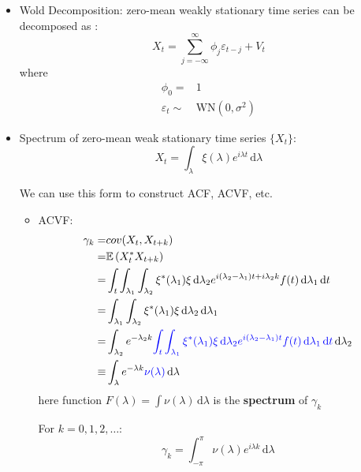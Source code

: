 \begin{itemize}[topsep=2pt,itemsep=0pt]
            
    

        \item Wold Decomposition: zero-mean weakly stationary time series can be decomposed as :
        \begin{equation}
            X_t=\sum_{j=-\infty}^\infty \phi _j\varepsilon _{t-j}+V_t 
        \end{equation}
        where
        \begin{align*}
            \phi _0=&1\\
            \varepsilon _t\sim &\mathrm{WN}(0,\sigma ^2) 
        \end{align*}


        \item Spectrum of zero-mean weak stationary time series $ \{X_t\} $:
        \begin{equation}
            X_t=\int _\lambda \xi (\lambda )e^{i\lambda t} \,\mathrm{d}\lambda 
        \end{equation}

        We can use this form to construct ACF, ACVF, etc.
        \begin{itemize}[topsep=2pt,itemsep=0pt]
            \item ACVF:
            \begin{align*}
                \gamma _k=&cov(X_t,X_{t+k})\\
                =&\mathbb{E}\left( X_t^*X_{t+k} \right)\\
                =&\int _{t}\int _{\lambda _1}\int _{\lambda _2} \xi ^*(\lambda _1)\xi  \,\mathrm{d}\lambda _2 e^{i(\lambda _2-\lambda _1)t+i\lambda _2k} f(t) \,\mathrm{d}\lambda _1 \,\mathrm{d}t \\
                =&\int _{\lambda _1}\int _{\lambda _2} \xi ^*(\lambda _1)\xi  \,\mathrm{d}\lambda _2  \,\mathrm{d}\lambda _1 \\
                =&\int _{\lambda _2}e^{-\lambda _2k} {\color{blue} \int _t\int _{\lambda_1} \xi ^*(\lambda _1)\xi  \,\mathrm{d}\lambda _2 e^{i(\lambda _2-\lambda _1)t} f(t) \,\mathrm{d}\lambda _1 \,\mathrm{d}t }  \,\mathrm{d}\lambda _2\\
                \equiv&\int _{\lambda } e^{-\lambda k}{\color{blue}\nu (\lambda )}  \,\mathrm{d}\lambda 
            \end{align*}
            here function $ F(\lambda )=\int \nu (\lambda ) \,\mathrm{d}\lambda  $ is the \textbf{spectrum} of $ \gamma _k $ 

            For $ k=0,1,2,\ldots $:
            \begin{equation}
                \gamma _k=\int _{-\pi}^\pi \nu (\lambda )e^{i\lambda k} \,\mathrm{d}\lambda  
            \end{equation}
            

\end{itemize}
\end{itemize}
